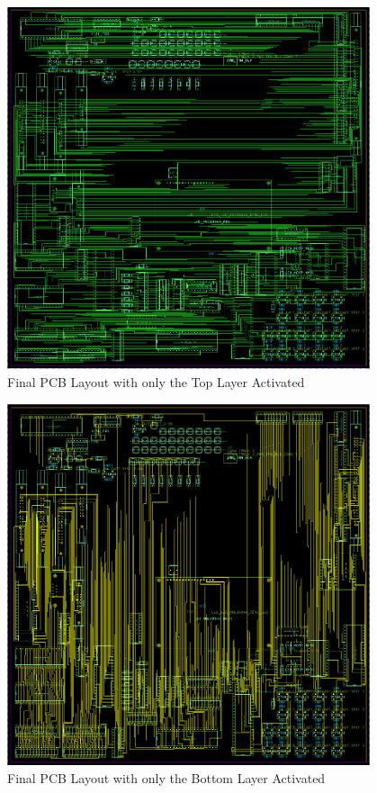\begin{appendices}
        \begin{figure}[ht]
            \begin{center}
                \includegraphics[width=0.95\textwidth]{figures/top.png}
                \caption{Final PCB Layout with only the Top Layer Activated} \label{fig:top}
            \end{center}
        \end{figure}

        \begin{figure}[ht]
            \begin{center}
                \includegraphics[width=0.95\textwidth]{figures/bottom.png}
                \caption{Final PCB Layout with only the Bottom Layer Activated} \label{fig:bottom}
            \end{center}
        \end{figure}


\end{appendices}
